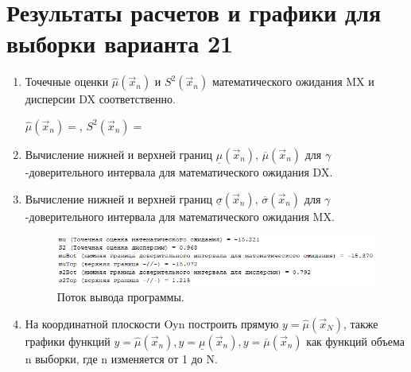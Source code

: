 \documentclass[a4paper,oneside,12pt]{extreport}
\theoremstyle{indented}
\begin{document}
\section{Результаты расчетов и графики для выборки варианта 21} 

\begin{enumerate}
\item Точечные оценки $\hat \mu (\vec x_n)$ и $ S^2 (\vec x_n)$ математического ожидания MX и дисперсии DX соответственно.

$\hat \mu (\vec x_n) = $, $ S^2 (\vec x_n) = $

\item Вычисление нижней и верхней границ $\underline \mu (\vec x_n)$, $\overline \mu (\vec x_n)$ для $\gamma$-доверительного интервала для математического ожидания DX. 
\item Вычисление нижней и верхней границ $\underline \sigma (\vec x_n)$, $\overline \sigma (\vec x_n)$ для $\gamma$-доверительного интервала для математического ожидания MX. 

\begin{figure}[H]
\begin{center}
\includegraphics[scale=1]{inc/img/output.png}
\captionsetup{justification=centering}
	\caption{Поток вывода программы.}
	\label{img:output}	
\end{center}
\end{figure}

\item На координатной плоскости Oyn построить прямую $y=\hat \mu (\vec x_N)$, также графики функций $y=\hat \mu (\vec x_n), y= \underline \mu (\vec x_n), y =\overline \mu (\vec x_n)$ как функций объема n выборки, где n изменяется от 1 до N.


\end{enumerate}
\end{document}
